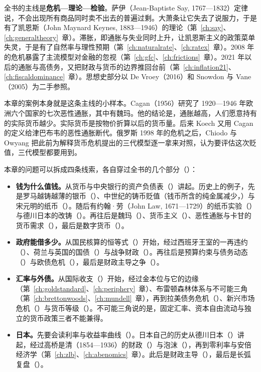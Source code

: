 全书的主线是\textbf{危机—理论—检验}。萨伊（Jean-Baptiste Say, 1767—1832）定律说，不会出现所有商品同时卖不出去的普遍过剩。大萧条让它失去了说服力，于是有了凯恩斯（John Maynard Keynes, 1883—1946）的理论（第~\ref{ch:say}、\ref{ch:generaltheory}~章）。滞胀，即通胀与失业同时上升，让凯恩斯主义的政策菜单失灵，于是有了自然率与理性预期（第~\ref{ch:naturalrate}、\ref{ch:ratex}~章）。2008 年的危机暴露了主流模型对金融的忽视（第~\ref{ch:gfc}、\ref{ch:frictions}~章）。2021 年以后的通胀与高债务，又把财政与货币的边界推回台前（第~\ref{ch:inflation21}、\ref{ch:fiscaldominance}~章）。思想史部分以 De Vroey（2016）和 Snowdon 与 Vane（2005）为二手参照\cite{devroey,snowdonvane}。

本章的案例本身就是这条主线的小样本。Cagan（1956）研究了 1920—1946 年欧洲六个国家的七次恶性通胀，其中有魏玛。他的结论是，通胀越高，人们愿意持有的实际货币越少\cite{cagan1956,koech2011}。实际货币是按物价折算以后的货币量。后来 Koech 又用 Cagan 的定义给津巴布韦的恶性通胀断代\cite{koech2011}。俄罗斯 1998 年的危机之后，Chiodo 与 Owyang 把此前为解释货币危机提出的三代模型逐一拿来对照，认为要评估这次贬值，三代模型都要用到\cite{chiodo2002}。

本章的问题可以拆成四条线索，各自穿过全书的几个部分（）：
\begin{itemize}
\item \textbf{钱为什么值钱。}从货币与中央银行的资产负债表（）讲起。历史上的例子，先是罗马越铸越薄的银币（）、中世纪的铸币贬值（钱币所含的纯金属减少，）与宋元明的纸币（）。随后有约翰·劳（John Law, 1671—1729）的纸币实验（）与德川日本的改铸（）。再往后是魏玛（）、货币主义（）、恶性通胀与卡甘的货币需求（），最后是数字货币（）。
\item \textbf{政府能借多少。}从国民核算的恒等式（）开始，经过西班牙王室的一再违约（）、荷兰与英国的国债（）与战争财政（）。再往后是预算约束与债务动态（）与欧债危机（），最后是财政主导之争（）。
\item \textbf{汇率与外债。}从国际收支（）开始，经过金本位与它的边缘（第~\ref{ch:goldstandard}、\ref{ch:periphery}~章）、布雷顿森林体系与不可能三角（第~\ref{ch:brettonwoods}、\ref{ch:mundell}~章），再到拉美债务危机（）、新兴市场危机（）与货币等级（）。不可能三角说的是，固定汇率、资本自由流动与独立的货币政策三者不能兼得。
\item \textbf{日本。}先要会读利率与收益率曲线（）。日本自己的历史从德川日本（）讲起，经过高桥是清（1854—1936）的财政（）与泡沫（），再到零利率与安倍经济学（第~\ref{ch:zlb}、\ref{ch:abenomics}~章）。此后是财政主导（），最后是长弧复盘（）。
\end{itemize}

